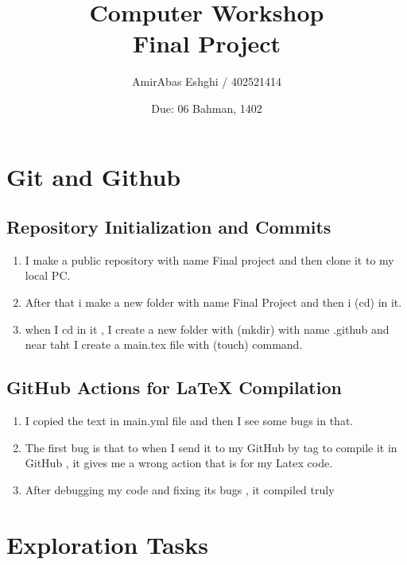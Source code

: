 \documentclass[titlepage]{article}
\title{Computer Workshop\\Final Project}
\author{AmirAbas Eshghi / 402521414}
\date{Due: 06 Bahman, 1402}
\begin{document}
	\maketitle
	\tableofcontents
	
	\newpage
	\section{Git and Github}
	\subsection{Repository Initialization and Commits} 
	\begin{enumerate}
	  \item I make a public repository with name Final project and then clone it to my local PC.
	  \item After that i  make a new folder with name Final Project and then i (cd) in it. 
	  \item when I cd in it , I create a new folder with (mkdir) with name .github and near taht I create a main.tex file with (touch) command.
  \end{enumerate}
  \subsection{GitHub Actions for LaTeX Compilation}
  \begin{enumerate}
  	\item I copied the text in main.yml file and then I see some bugs in that. 
  	\item The first bug is that to when I send it to my GitHub by tag to compile it in GitHub , it gives me a wrong action that is for my Latex code.
  	\item After debugging my code and fixing its bugs , it compiled truly 
  \end{enumerate}
  




  \newpage
	\section{Exploration Tasks}
\end{document}
